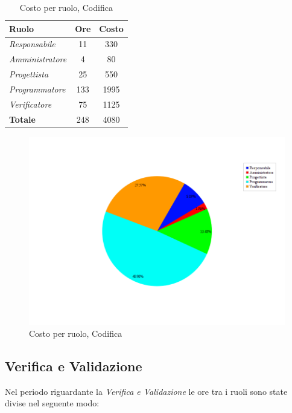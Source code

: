 \begin{table}[H]
	\begin{center}
		\begin{tabular}{|l|c|c|}
			\hline
			\textbf{Ruolo}	& \textbf{Ore} &	\textbf{Costo}	 \\
			\hline
			\textit{Responsabile}	&	11	&	330		\\
			\hline
			\textit{Amministratore}	&	4	&	80		\\
			\hline
			\textit{Progettista}		&	25	&	550		\\
			\hline
			\textit{Programmatore}	&	133	&	1995	\\
			\hline
			\textit{Verificatore}	&	75	&	1125	\\
			\hline
			\textbf{Totale}	&	248	&	4080	\\
			\hline
		\end{tabular}
	\end{center}
	\caption{Costo per ruolo, Codifica}
\end{table}

\begin{figure}[H]
	\centering
	\includegraphics[scale=0.4]{immagini/Grafi/CostoCod}
	\caption{Costo per ruolo, Codifica}
\end{figure}

\subsection{Verifica e Validazione}
Nel periodo riguardante la \textit{Verifica e Validazione} le ore tra i ruoli sono state divise nel seguente modo:

